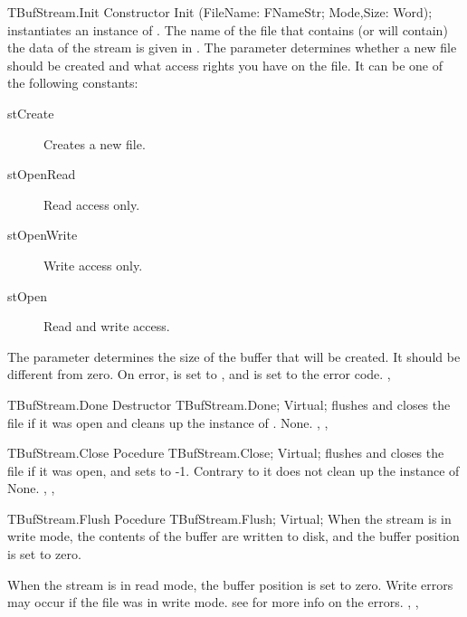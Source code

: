 \begin{procedure}{TBufStream.Init}
\Declaration
Constructor Init (FileName: FNameStr; Mode,Size: Word);
\Description
{} instantiates an instance of . The name of the 
file that contains (or will contain) the data of the stream is given in
. The  parameter determines whether a new file 
should be created and what access rights you have on the file. 
It can be one of the following constants:
\begin{description}
\item[stCreate] Creates a new file.
\item[stOpenRead] Read access only.
\item[stOpenWrite] Write access only.
\item[stOpen] Read and write access.
\end{description}
The  parameter determines the size of the buffer that will be
created. It should be different from zero.
\Errors
On error,  is set to , and 
is set to the \dos error code.
\SeeAlso
{}, 
\end{procedure}

\begin{procedure}{TBufStream.Done}
\Declaration
Destructor TBufStream.Done; Virtual;
\Description
{} flushes and closes the file if it was open and cleans up the 
instance of . 
\Errors
None.
\SeeAlso
{}, ,
\end{procedure}

\begin{procedure}{TBufStream.Close}
\Declaration
Pocedure TBufStream.Close; Virtual;
\Description
{} flushes and closes the file if it was open, and sets  to -1. 
Contrary to  it does not clean up the instance
of 
\Errors
None.
\SeeAlso
{}, ,
\end{procedure}

\begin{procedure}{TBufStream.Flush}
\Declaration
Pocedure TBufStream.Flush; Virtual;
\Description
When the stream is in write mode, the contents of the buffer are written to
disk, and the buffer position is set to zero.

When the stream is in read mode, the buffer position is set to zero.
\Errors
Write errors may occur if the file was in write mode.
see  for more info on the errors.
\SeeAlso
{}, ,
\end{procedure}

